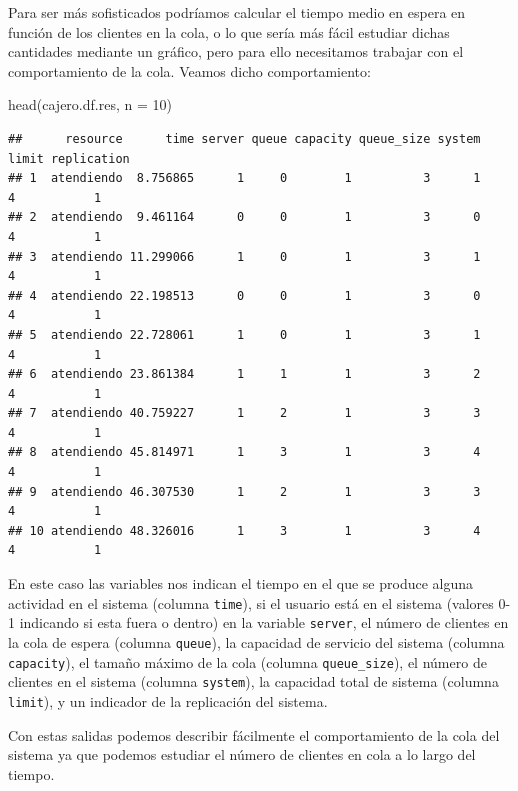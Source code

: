 \documentclass[
]{book}
\newenvironment{Shaded}{\begin{snugshade}}{\end{snugshade}}
\newcommand{\AttributeTok}[1]{\textcolor[rgb]{0.77,0.63,0.00}{#1}}
\newcommand{\DecValTok}[1]{\textcolor[rgb]{0.00,0.00,0.81}{#1}}
\newcommand{\FunctionTok}[1]{\textcolor[rgb]{0.00,0.00,0.00}{#1}}
\newcommand{\NormalTok}[1]{#1}
\theoremstyle{definition}
\theoremstyle{definition}
\theoremstyle{definition}
\theoremstyle{definition}
\theoremstyle{remark}
\begin{document}
Para ser más sofisticados podríamos calcular el tiempo medio en espera en función de los clientes en la cola, o lo que sería más fácil estudiar dichas cantidades mediante un gráfico, pero para ello necesitamos trabajar con el comportamiento de la cola. Veamos dicho comportamiento:

\begin{Shaded}
\begin{Highlighting}[]
\FunctionTok{head}\NormalTok{(cajero.df.res, }\AttributeTok{n =} \DecValTok{10}\NormalTok{)}
\end{Highlighting}
\end{Shaded}

\begin{verbatim}
##      resource      time server queue capacity queue_size system limit replication
## 1  atendiendo  8.756865      1     0        1          3      1     4           1
## 2  atendiendo  9.461164      0     0        1          3      0     4           1
## 3  atendiendo 11.299066      1     0        1          3      1     4           1
## 4  atendiendo 22.198513      0     0        1          3      0     4           1
## 5  atendiendo 22.728061      1     0        1          3      1     4           1
## 6  atendiendo 23.861384      1     1        1          3      2     4           1
## 7  atendiendo 40.759227      1     2        1          3      3     4           1
## 8  atendiendo 45.814971      1     3        1          3      4     4           1
## 9  atendiendo 46.307530      1     2        1          3      3     4           1
## 10 atendiendo 48.326016      1     3        1          3      4     4           1
\end{verbatim}

En este caso las variables nos indican el tiempo en el que se produce alguna actividad en el sistema (columna \texttt{time}), si el usuario está en el sistema (valores 0-1 indicando si esta fuera o dentro) en la variable \texttt{server}, el número de clientes en la cola de espera (columna \texttt{queue}), la capacidad de servicio del sistema (columna \texttt{capacity}), el tamaño máximo de la cola (columna \texttt{queue\_size}), el número de clientes en el sistema (columna \texttt{system}), la capacidad total de sistema (columna \texttt{limit}), y un indicador de la replicación del sistema.

Con estas salidas podemos describir fácilmente el comportamiento de la cola del sistema ya que podemos estudiar el número de clientes en cola a lo largo del tiempo.
\end{document}
